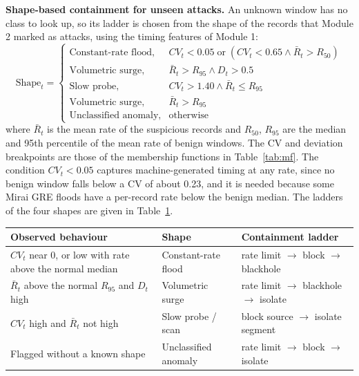 \documentclass[]{interact}
\theoremstyle{plain}
\theoremstyle{definition}
\begin{document}
\textbf{Shape-based containment for unseen attacks.} An unknown window has no class to look up, so its ladder is chosen from the shape of the records that Module 2 marked as attacks, using the timing features of Module 1:
\begin{equation}
  \text{Shape}_t = \begin{cases}
    \text{Constant-rate flood}, & CV_t < 0.05 \;\text{or}\; \left(CV_t < 0.65 \wedge \bar{R}_t > R_{50}\right)\\
    \text{Volumetric surge}, & \bar{R}_t > R_{95} \wedge D_t > 0.5\\
    \text{Slow probe}, & CV_t > 1.40 \wedge \bar{R}_t \le R_{95}\\
    \text{Volumetric surge}, & \bar{R}_t > R_{95}\\
    \text{Unclassified anomaly}, & \text{otherwise}
  \end{cases}
  \label{eq:shape}
\end{equation}
where $\bar{R}_t$ is the mean rate of the suspicious records and $R_{50}$, $R_{95}$ are the median and 95th percentile of the mean rate of benign windows. The CV and deviation breakpoints are those of the membership functions in Table~\ref{tab:mf}. The condition $CV_t < 0.05$ captures machine-generated timing at any rate, since no benign window falls below a CV of about 0.23, and it is needed because some Mirai GRE floods have a per-record rate below the benign median. The ladders of the four shapes are given in Table~\ref{tab:shape}.

\begin{table}[htbp]
{\small
\begin{tabular}{lll}
\toprule
Observed behaviour & Shape & Containment ladder \\
\midrule
$CV_t$ near 0, or low with rate above the normal median & Constant-rate flood & rate limit $\rightarrow$ block $\rightarrow$ blackhole \\
$\bar{R}_t$ above the normal $R_{95}$ and $D_t$ high & Volumetric surge & rate limit $\rightarrow$ blackhole $\rightarrow$ isolate \\
$CV_t$ high and $\bar{R}_t$ not high & Slow probe / scan & block source $\rightarrow$ isolate segment \\
Flagged without a known shape & Unclassified anomaly & rate limit $\rightarrow$ block $\rightarrow$ isolate \\
\bottomrule
\end{tabular}}
\label{tab:shape}
\end{table}
\end{document}
